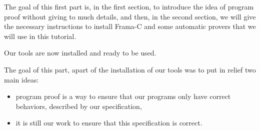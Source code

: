 The goal of this first part is, in the first section, to introduce the
idea of program proof without giving to much details, and then, in the
second section, we will give the necessary instructions to install
Frama-C and some automatic provers that we will use in this tutorial.













\horizontalLine



Our tools are now installed and ready to be used.



The goal of this part, apart of the installation of our tools was to put
in relief two main ideas:


\begin{itemize}
\item program proof is a way to ensure that our programs only have correct
  behaviors, described by our specification,
\item it is still our work to ensure that this specification is correct.
\end{itemize}
